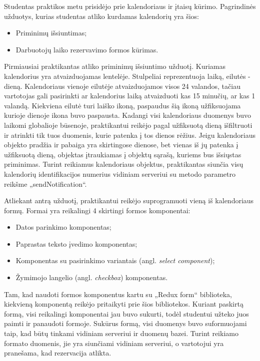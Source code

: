 \documentclass{VUMIFPSbakalaurinis}
\begin{document}
Studentas praktikos metu prisidėjo prie kalendoriaus ir įtaisų kūrimo. Pagrindinės užduotys, kurias studentas atliko kurdamas kalendorių yra šios: 
\begin{itemize}
    \item Priminimų išsiuntimas;
    \item Darbuotojų laiko rezervavimo formos kūrimas.
\end{itemize}

Pirmiausiai praktikantas atliko priminimų išsiuntimo užduotį. Kuriamas kalendorius yra atvaizduojamas lentelėje. Stulpeliai reprezentuoja laiką, eilutės - dieną. Kalendoriaus vienoje eilutėje atvaizduojamos visos 24 valandos, tačiau vartotojas gali pasirinkti ar kalendorius laiką atvaizduoti kas 15 minučių, ar kas 1 valandą. Kiekviena eilutė turi laiško ikoną, paspaudus šią ikoną užfiksuojama kurioje dienoje ikona buvo paspausta. Kadangi visi kalendoriaus duomenys buvo laikomi globalioje būsenoje, praktikantui reikėjo pagal užfiksuotą dieną išfiltruoti ir atrinkti tik tuos duomenis, kurie patenka į tos dienos rėžius. Jeigu kalendoriaus objekto pradžia ir pabaiga yra skirtingose dienose, bet vienas iš jų patenka į užfiksuotą dieną, objektas įtraukiamas į objektų sąrašą, kuriems bus išsiųstas priminimas. Turint reikiamus kalendoriaus objektus, praktikantas siunčia visų kalendorių identifikacijos numerius vidiniam serveriui su metodo parametro reikšme „sendNotification“.

Atliekant antrą užduotį, praktikantui reikėjo suprogramuoti vieną iš kalendoriaus formų. Formai yra reikalingi 4 skirtingi formos komponentai:
\begin{itemize}
    \item Datos parinkimo komponentas;
    \item Paprastas teksto įvedimo komponentas;
    \item Komponentas su pasirinkimo variantais (angl. \textit{select component});
    \item Žymimojo langelio (angl. \textit{checkbox}) komponentas.
\end{itemize} 
Tam, kad naudoti formos komponentus kartu su „Redux form“ biblioteka, kiekvieną komponentą reikėjo pritaikyti prie šios bibliotekos. Kuriant paskirtą formą, visi reikalingi komponentai jau buvo sukurti, todėl studentui užteko juos paimti ir panaudoti formoje. Sukūrus formą, visi duomenys buvo suformuojami taip, kad būtų tinkami vidiniam serveriui ir duomenų bazei. Turint reikiamo formato duomenis, jie yra siunčiami vidiniam serveriui, o vartotojui yra pranešama, kad rezervacija atlikta.
\end{document}
